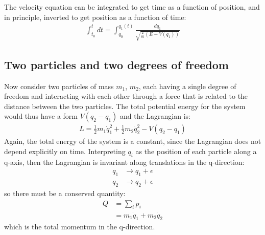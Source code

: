 The velocity equation can be integrated to get time as a function of position, and in principle, inverted to get position as a function of time:
\begin{align}
\int_{t_0}^t dt=\int_{q_0}^{q_1(t)}\frac{dq_1}{\sqrt{\frac{2}{m}(E-V(q_1))}}
\end{align}
\subsection{Two particles and two degrees of freedom}
Now consider two particles of mass $m_1$, $m_2$, each having a single degree of freedom and interacting with each other through a force that is related to the distance between the two particles. The total potential energy for the system would thus have a form $V(q_2-q_1)$ and the Lagrangian is:
\begin{align}
L=\frac{1}{2}m_1\dot{q}_1^2+\frac{1}{2}m_2\dot{q}_2^2-V(q_2-q_1)
\end{align}
Again, the total energy of the system is a constant, since the Lagrangian does not depend explicitly on time. Interpreting $q_i$ as the position of each particle along a q-axis, then the Lagrangian is invariant along translations in the q-direction:
\begin{align}
q_1&\to q_1+\epsilon\\
q_2&\to q_2+\epsilon
\end{align}
so there must be a conserved quantity:
\begin{align}
Q&=\sum_ip_i\nonumber\\
&=m_1\dot{q}_1+m_2\dot{q}_2
\end{align}
which is the total momentum in the q-direction.

